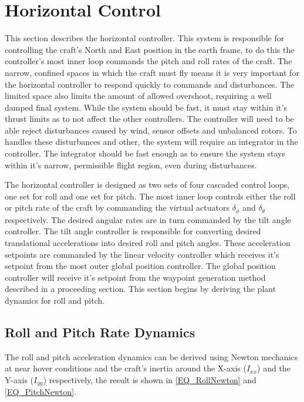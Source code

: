 	 
\section{Horizontal Control}
This section describes the horizontal controller. This system is responsible for controlling the craft's North and East position in the earth frame, to do this the controller's most inner loop commands the pitch and roll rates of the craft. The narrow, confined spaces in which the craft must fly means it is very important for the horizontal controller to respond quickly to commands and disturbances. The limited space also limits the amount of allowed overshoot, requiring a well damped final system. While the system should be fast, it must stay within it's thrust limits as to not affect the other controllers. The controller will need to be able reject disturbances caused by wind, sensor offsets and unbalanced rotors. To handles these disturbances and other, the system will require an integrator in the controller. The integrator should be fast enough as to ensure the system stays within it's narrow, permissible flight region, even during disturbances.

The horizontal controller is designed as two sets of four cascaded control loops, one set for roll and one set for pitch. The most inner loop controls either the roll or pitch rate of the craft by commanding the virtual actuators $\delta_\phi$ and $\delta_\theta$ respectively. The desired angular rates are in turn commanded by the tilt angle controller. The tilt angle controller is responsible for converting desired translational accelerations into desired roll and pitch angles. These acceleration setpoints are commanded by the linear velocity controller which receives it's setpoint from the most outer global position controller. The global position controller will receive it's setpoint from the waypoint generation method described in a proceeding section. This section begins by deriving the plant dynamics for roll and pitch.
	
	\subsection{Roll and Pitch Rate Dynamics}
	The roll and pitch acceleration dynamics can be derived using Newton mechanics at near hover conditions and the craft's inertia around the X-axis ($I_{xx}$) and the Y-axis ($I_{yy}$) respectively, the result is shown in \eqref{EQ_RollNewton} and \eqref{EQ_PitchNewton}.
	
